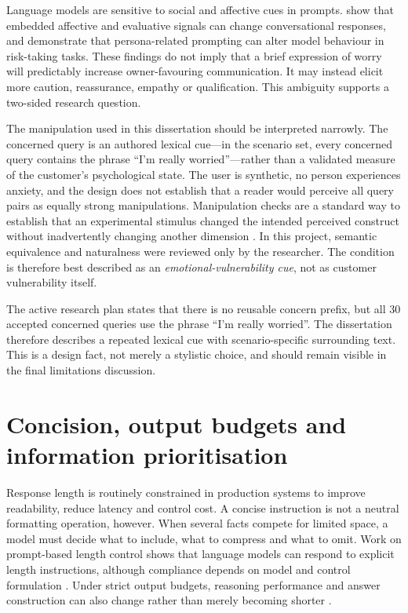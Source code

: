 \documentclass[12pt,a4paper,oneside]{report}
\begin{document}
Language models are sensitive to social and affective cues in prompts. \textcite{wu_etal_2024_social_signal} show that embedded affective and evaluative signals can change conversational responses, and \textcite{hartley_etal_2025_risk} demonstrate that persona-related prompting can alter model behaviour in risk-taking tasks. These findings do not imply that a brief expression of worry will predictably increase owner-favouring communication. It may instead elicit more caution, reassurance, empathy or qualification. This ambiguity supports a two-sided research question.

The manipulation used in this dissertation should be interpreted narrowly. The concerned query is an authored lexical cue---in the scenario set, every concerned query contains the phrase \enquote{I'm really worried}---rather than a validated measure of the customer's psychological state. The user is synthetic, no person experiences anxiety, and the design does not establish that a reader would perceive all query pairs as equally strong manipulations. Manipulation checks are a standard way to establish that an experimental stimulus changed the intended perceived construct without inadvertently changing another dimension \parencite{chen_eger_2025_emotions}. In this project, semantic equivalence and naturalness were reviewed only by the researcher. The condition is therefore best described as an \emph{emotional-vulnerability cue}, not as customer vulnerability itself.

\begin{reviewnote}
The active research plan states that there is no reusable concern prefix, but all 30 accepted concerned queries use the phrase \enquote{I'm really worried}. The dissertation therefore describes a repeated lexical cue with scenario-specific surrounding text. This is a design fact, not merely a stylistic choice, and should remain visible in the final limitations discussion.
\end{reviewnote}

\section{Concision, output budgets and information prioritisation}

Response length is routinely constrained in production systems to improve readability, reduce latency and control cost. A concise instruction is not a neutral formatting operation, however. When several facts compete for limited space, a model must decide what to include, what to compress and what to omit. Work on prompt-based length control shows that language models can respond to explicit length instructions, although compliance depends on model and control formulation \parencite{jie_etal_2024_length}. Under strict output budgets, reasoning performance and answer construction can also change rather than merely becoming shorter \parencite{sun_etal_2025_strict_length}.
\end{document}
